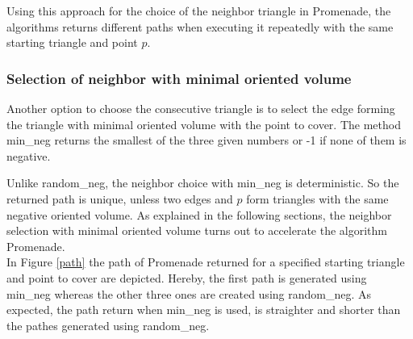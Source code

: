 \documentclass[10pt]{article}
\begin{document}
Using this approach for the choice of the neighbor triangle in {\ttfamily Promenade}, the algorithms returns different paths when executing it repeatedly with the same starting triangle and point $p$.

\subsubsection{Selection of neighbor with minimal oriented volume} \label{min_neg_vol}

Another option to choose the consecutive triangle is to select the edge forming the triangle with minimal oriented volume with the point to cover. The method {\ttfamily min\_neg} returns the smallest of the three given numbers or -1 if none of them is negative.

Unlike {\ttfamily random\_neg}, the neighbor choice with {\ttfamily min\_neg} is deterministic. So the returned path is unique, unless two edges and $p$ form triangles with the same negative oriented volume. As explained in the following sections, the neighbor selection with minimal oriented volume turns out to accelerate the algorithm {\ttfamily Promenade}.\\

In Figure \ref{path} the path of {\ttfamily Promenade} returned for a specified starting triangle and point to cover are depicted. Hereby, the first path is generated using {\ttfamily min\_neg} whereas the other three ones are created using {\ttfamily random\_neg}. As expected, the path return when {\ttfamily min\_neg} is used, is straighter and shorter than the pathes generated using {\ttfamily random\_neg}. 
\end{document}
